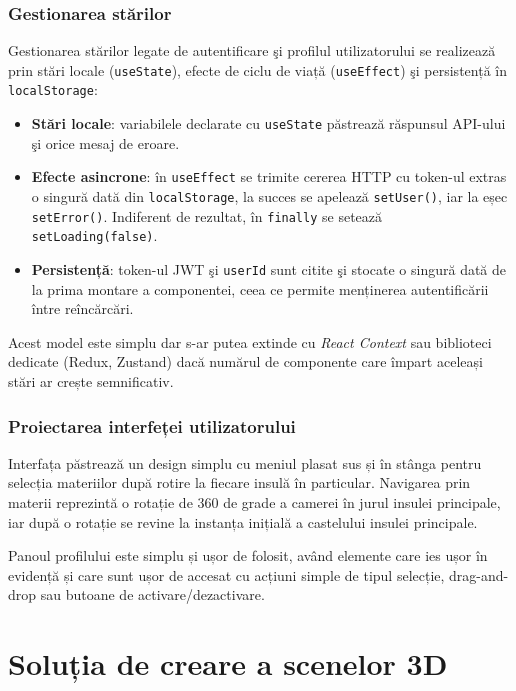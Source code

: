 \subsubsection{Gestionarea stărilor}
Gestionarea stărilor legate de autentificare şi profilul utilizatorului se realizează prin 
stări locale (\texttt{useState}), efecte de ciclu de viață (\texttt{useEffect}) şi persistență
în \texttt{localStorage}:
\begin{itemize}
  \item \textbf{Stări locale}:
  variabilele declarate cu \texttt{useState} păstrează 
  răspunsul API-ului şi orice mesaj de eroare.
  \item \textbf{Efecte asincrone}:
  în \texttt{useEffect} se trimite cererea HTTP cu token-ul extras o singură dată din 
  \texttt{localStorage}, la succes se apelează \texttt{setUser()}, iar la eșec \texttt{setError()}. Indiferent de rezultat, în \texttt{finally} se setează \texttt{setLoading(false)}.
  \item \textbf{Persistență}:
  token-ul JWT şi \texttt{userId} sunt citite şi stocate o singură dată de la prima montare
  a componentei, ceea ce permite menținerea autentificării între reîncărcări.
\end{itemize}
Acest model este simplu dar s-ar putea extinde cu \emph{React Context}
sau biblioteci dedicate (Redux, Zustand) dacă numărul de componente care împart aceleași stări
ar crește semnificativ.


\subsubsection{Proiectarea interfeței utilizatorului}

Interfața păstrează un design simplu cu meniul plasat sus și în stânga pentru selecția materiilor
după rotire la fiecare insulă în particular. Navigarea prin materii
reprezintă o rotație de 360 de grade a camerei în jurul insulei principale, iar după o rotație
se revine la instanța inițială a castelului insulei principale.

Panoul profilului este simplu și ușor de folosit, având elemente care ies ușor în evidență
și care sunt ușor de accesat cu acțiuni simple de tipul selecție, drag-and-drop sau butoane de activare/dezactivare.

\section{Soluția de creare a scenelor 3D}
\label{sec:proj-3d}
